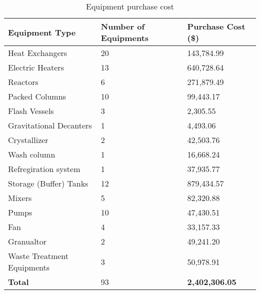 \begin{table}[H]
\centering
\caption{Equipment purchase cost}
\label{tab:equipment purchase}
\begin{tabular}{lll}
\toprule
\textbf{Equipment Type}    & \textbf{Number of Equipments} & \textbf{Purchase Cost (\$)} \\\midrule
Heat Exchangers            & 20                            & 143,784.99                  \\
Electric Heaters           & 13                            & 640,728.64                  \\
Reactors                   & 6                             & 271,879.49                  \\
Packed Columns             & 10                            & 99,443.17                   \\
Flash Vessels              & 3                             & 2,305.55                    \\
Gravitational Decanters    & 1                             & 4,493.06                    \\
Crystallizer               & 2                             & 42,503.76                   \\
Wash column                & 1                             & 16,668.24                   \\
Refregiration system       & 1                             & 37,935.77                   \\
Storage (Buffer) Tanks     & 12                            & 879,434.57                  \\
Mixers                     & 5                             & 82,320.88                   \\
Pumps                      & 10                            & 47,430.51                   \\
Fan                        & 4                             & 33,157.33                   \\
Granualtor                 & 2                             & 49,241.20                   \\
Waste Treatment Equipments & 3                             & 50,978.91                   \\ \hline
\textbf{Total}             & 93                            & \textbf{2,402,306.05}       \\ \bottomrule
\end{tabular}
\end{table}

